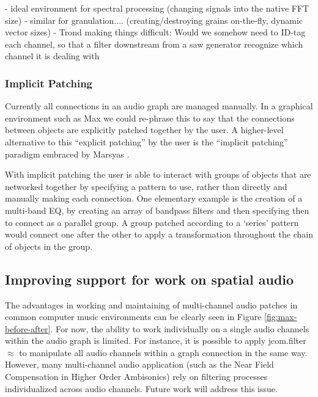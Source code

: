 \documentclass[twoside,a4paper]{article}
\begin{document}
- ideal environment for spectral processing (changing signals into the native FFT size)
- similar for granulation.... (creating/destroying grains on-the-fly, dynamic vector sizes)
- Trond making things difficult: Would we somehow need to ID-tag each channel, so that a filter downstream from a saw generator recognize which channel it is dealing with




\subsubsection{Implicit Patching} %

Currently all connections in an audio graph are managed manually.  In a graphical environment such as Max we could re-phrase this to say that the connections between objects are explicitly patched together by the user.  A higher-level alternative to this ``explicit patching'' by the user is the ``implicit patching'' paradigm embraced by Marsyas \cite{Bray:2005}.

With implicit patching the user is able to interact with groups of objects that are networked together by specifying a pattern to use, rather than directly and manually making each connection.  
One elementary example is the creation of a multi-band EQ, by creating an array of bandpass filters and then specifying then to connect as a parallel group.  
A group patched according to a `series' pattern would connect one after the other to apply a transformation throughout the chain of objects in the group.




\subsection{Improving support for work on spatial audio} %
The advantages in working and maintaining of multi-channel audio patches in common computer music environments can be clearly seen in Figure \ref{fig:max-before-after}. 
For now, the ability to work individually on a single audio channels within the audio graph is limited.
For instance, it is possible to apply jcom.filter$\approx$ to manipulate all audio channels within a graph connection in the same way. However, many multi-channel audio application (such as the Near Field Compensation in Higher Order Ambisonics) rely on filtering processes individualized across audio channels. Future work will address this issue.
\end{document}
